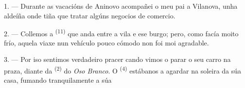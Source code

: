 %
%
%


\VUsaut{4.0mm}
\VUsaut{3.0mm}
\VUfilet{16mm}
\VUsaut{5.6mm}
\VUsaut{3.0mm}

\VUsaut{3.0mm}

\VUsaut{4.0mm}

1. --- Durante as vacacións de Aninovo acompañei o meu pai a Vilanova, unha aldeíña onde tiña
que tratar algúns negocios de comercio.

2. --- Collemos a  \textsuperscript{(11)} que anda entre a vila e ese
burgo; pero, como facía moito frío, aquela viaxe nun vehículo pouco cómodo non foi moi
agradable.

3. --- Por iso sentimos verdadeiro pracer cando vimos o  parar o seu carro na
praza, diante da  \textsuperscript{(2)} do \textit{Oso Branco}. O
 \textsuperscript{(4)} estábanos a agardar na soleira da súa casa, fumando
tranquilamente a súa 

